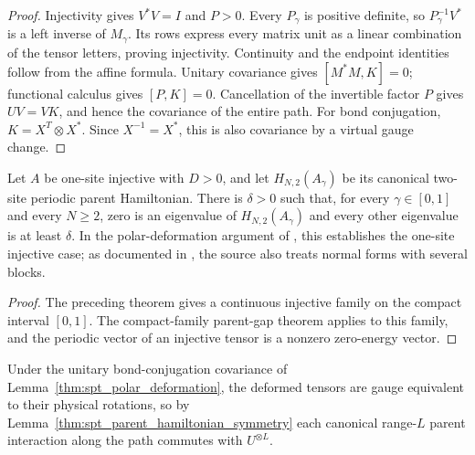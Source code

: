 \begin{proof}\leanok
    Injectivity gives $V^*V=I$ and $P>0$. Every $P_\gamma$ is positive
    definite, so $P_\gamma^{-1}V^*$ is a left inverse of $M_\gamma$.
    Its rows express every matrix unit as a linear combination of the
    tensor letters, proving injectivity. Continuity and the endpoint
    identities follow from the affine formula. Unitary covariance gives
    $[M^*M,K]=0$; functional calculus gives $[P,K]=0$. Cancellation of
    the invertible factor $P$ gives $UV=VK$, and hence the covariance
    of the entire path. For bond conjugation, $K=X^T\otimes X^*$.
    Since $X^{-1}=X^*$, this is also covariance by a virtual gauge change.
\end{proof}

\begin{lemma}
    \label{thm:spt_polar_deformation_gap}
    \leanok

    Let $A$ be one-site injective with $D>0$, and let $H_{N,2}(A_\gamma)$
    be its canonical two-site periodic parent Hamiltonian. There is
    $\delta>0$ such that, for every $\gamma\in[0,1]$ and every $N\geq2$,
    zero is an eigenvalue of $H_{N,2}(A_\gamma)$ and every other eigenvalue
    is at least $\delta$.
    In the polar-deformation argument of
    \cite[Section~II.C and Appendix~A]{Schuch2011Phases}, this establishes
    the one-site injective case; as documented in
    \cite{gap:spc11_uniform_gap_injective_scope}, the source also treats
    normal forms with several blocks.
\end{lemma}

\begin{proof}\leanok
    The preceding theorem gives a continuous injective family on the compact
    interval $[0,1]$. The compact-family parent-gap theorem applies to this
    family, and the periodic vector of an injective tensor is a nonzero
    zero-energy vector.
\end{proof}

Under the unitary bond-conjugation covariance of
Lemma~\ref{thm:spt_polar_deformation}, the deformed tensors are gauge
equivalent to their physical rotations, so by
Lemma~\ref{thm:spt_parent_hamiltonian_symmetry} each canonical range-$L$
parent interaction along the path commutes with $U^{\otimes L}$.

